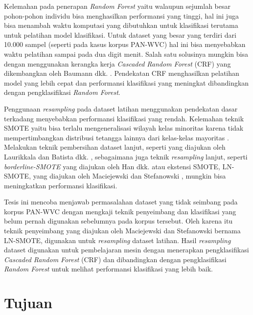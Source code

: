 \documentclass[12pt,a4paper,titlepage]{article}
\begin{document}
Kelemahan pada penerapan \textit{Random Forest} yaitu walaupun sejumlah besar pohon-pohon individu bisa menghasilkan performansi yang tinggi, hal ini juga bisa menambah waktu komputasi yang dibutuhkan untuk klasifikasi terutama untuk pelatihan model klasifikasi.
Untuk dataset yang besar yang terdiri dari 10.000 sampel (seperti pada kasus korpus PAN-WVC) hal ini bisa menyebabkan waktu pelatihan sampai pada dua digit menit.
Salah satu solusinya mungkin bisa dengan menggunakan kerangka kerja \textit{Cascaded Random Forest} (CRF) yang dikembangkan oleh Baumann dkk. \cite{baumann2013cascaded}.
Pendekatan CRF menghasilkan pelatihan model yang lebih cepat dan performansi klasifikasi yang meningkat dibandingkan dengan pengklasifikasi \textit{Random Forest}.

Penggunaan \textit{resampling} pada dataset latihan menggunakan pendekatan dasar terkadang menyebabkan performansi klasifikasi yang rendah.
Kelemahan teknik SMOTE yaitu bisa terlalu mengeneralisasi wilayah kelas minoritas karena tidak mempertimbangkan distribusi tetangga lainnya dari kelas-kelas mayoritas \cite{maciejewski2011local}.
Melakukan teknik pembersihan dataset lanjut, seperti yang diajukan oleh Laurikkala \cite{laurikkala2001improving} dan Batista dkk. \cite{batista2004study}, sebagaimana juga teknik \textit{resampling} lanjut, seperti \textit{borderline-SMOTE} yang diajukan oleh Han dkk. \cite{han2005borderline} atau ekstensi SMOTE, LN-SMOTE, yang diajukan oleh Maciejewski dan Stefanowski \cite{maciejewski2011local}, mungkin bisa meningkatkan performansi klasifikasi.

Tesis ini mencoba menjawab permasalahan dataset yang tidak seimbang pada korpus PAN-WVC dengan mengkaji teknik penyeimbang dan klasifikasi yang belum pernah digunakan sebelumnya pada korpus tersebut.
Oleh karena itu teknik penyeimbang yang diajukan oleh Maciejewski dan Stefanowski \cite{maciejewski2011local} bernama LN-SMOTE, digunakan untuk \textit{resampling} dataset latihan.
Hasil \textit{resampling} dataset digunakan untuk pembelajaran mesin dengan menerapkan pengklasifikasi \textit{Cascaded Random Forest} (CRF) dan dibandingkan dengan pengklasifikasi \textit{Random Forest} untuk melihat performansi klasifikasi yang lebih baik.


\section{Tujuan}\label{sec:tujuan}
\end{document}
